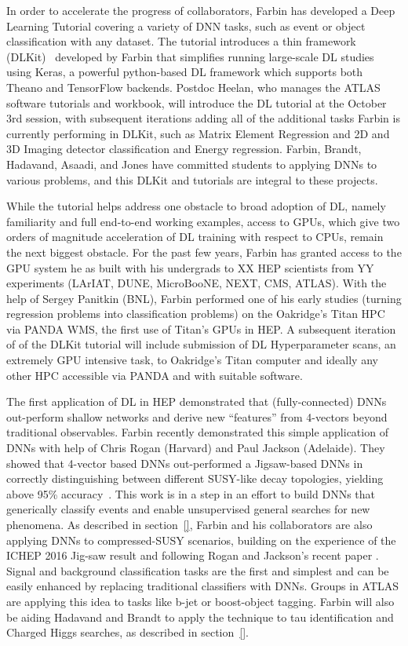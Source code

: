 In order to accelerate the progress of collaborators, Farbin has
developed a Deep Learning Tutorial covering a variety of DNN tasks,
such as event or object classification with any dataset.  The tutorial
introduces a thin framework (DLKit)~\cite{} developed by Farbin that
simplifies running large-scale DL studies using Keras, a powerful
python-based DL framework which supports both Theano and TensorFlow
backends. Postdoc Heelan, who manages the ATLAS software tutorials
and workbook, will introduce the DL tutorial at the October 3rd
session, with subsequent iterations adding all of the additional tasks
Farbin is currently performing in DLKit, such as Matrix Element
Regression and 2D and 3D Imaging detector classification and Energy
regression. Farbin, Brandt, Hadavand, Asaadi, and Jones have committed
students to applying DNNs to various problems, and this DLKit and
tutorials are integral to these projects.

While the tutorial helps address one obstacle to broad adoption of DL,
namely familiarity and full end-to-end working examples, access to
GPUs, which give two orders of magnitude acceleration of DL training
with respect to CPUs, remain the next biggest obstacle. For the past
few years, Farbin has granted access to the GPU system he as built
with his undergrads to XX HEP scientists from YY experiments (LArIAT,
DUNE, MicroBooNE, NEXT, CMS, ATLAS). With the help of Sergey Panitkin
(BNL), Farbin performed one of his early studies (turning regression
problems into classification problems) on the Oakridge's Titan HPC via
PANDA WMS, the first use of Titan's GPUs in HEP. A subsequent
iteration of of the DLKit tutorial will include submission of DL
Hyperparameter scans, an extremely GPU intensive task, to Oakridge's
Titan computer and ideally any other HPC accessible via PANDA and with
suitable software.



The first application of DL in HEP demonstrated that (fully-connected)
DNNs out-perform shallow networks and derive new ``features'' from
4-vectors beyond traditional observables. Farbin recently demonstrated
this simple application of DNNs with help of Chris Rogan (Harvard) and
Paul Jackson (Adelaide). They showed that 4-vector based DNNs
out-performed a Jigsaw-based DNNs in correctly distinguishing between
different SUSY-like decay topologies, yielding above 95\%
accuracy~\cite{}. This work is in a step in an effort to build DNNs
that generically classify events and enable unsupervised general
searches for new phenomena. As described in section~\ref{}, Farbin and
his collaborators are also applying DNNs to compressed-SUSY scenarios,
building on the experience of the ICHEP 2016 Jig-saw result and
following Rogan and Jackson's recent paper \cite{}. Signal and
background classification tasks are the first and simplest and can be
easily enhanced by replacing traditional classifiers with DNNs. Groups
in ATLAS are applying this idea to tasks like b-jet or boost-object
tagging. Farbin will also be aiding Hadavand and Brandt to apply the
technique to tau identification and Charged Higgs searches, as
described in section~\ref{}.

